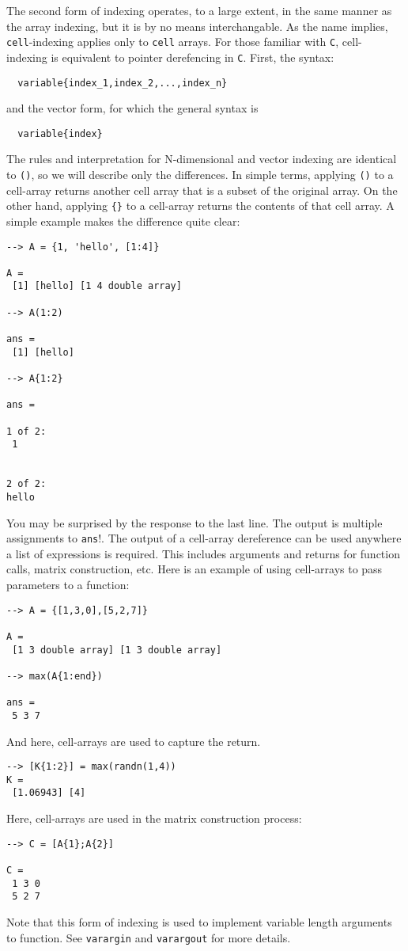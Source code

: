 The second form of indexing operates, to a large extent, in
the same manner as the array indexing, but it is by no means
interchangable.  As the name implies, \verb|cell|-indexing applies
only to \verb|cell| arrays.  For those familiar with \verb|C|, cell-
indexing is equivalent to pointer derefencing in \verb|C|.  First,
the syntax:
\begin{verbatim}
  variable{index_1,index_2,...,index_n}
\end{verbatim}
and the vector form, for which the general syntax is
\begin{verbatim}
  variable{index}
\end{verbatim}
The rules and interpretation for N-dimensional and vector indexing
are identical to \verb|()|, so we will describe only the differences.
In simple terms, applying \verb|()| to a cell-array returns another
cell array that is a subset of the original array.  On the other
hand, applying \verb|{}| to a cell-array returns the contents of that
cell array.  A simple example makes the difference quite clear:
\begin{verbatim}
--> A = {1, 'hello', [1:4]}

A = 
 [1] [hello] [1 4 double array] 

--> A(1:2)

ans = 
 [1] [hello] 

--> A{1:2}

ans = 

1 of 2:
 1 


2 of 2:
hello
\end{verbatim}
You may be surprised by the response to the last line.  The output
is multiple assignments to \verb|ans|!.  The output of a cell-array
dereference can be used anywhere a list of expressions is required.
This includes arguments and returns for function calls, matrix
construction, etc.  Here is an example of using cell-arrays to pass
parameters to a function:
\begin{verbatim}
--> A = {[1,3,0],[5,2,7]}

A = 
 [1 3 double array] [1 3 double array] 

--> max(A{1:end})

ans = 
 5 3 7 
\end{verbatim}
And here, cell-arrays are used to capture the return.
\begin{verbatim}
--> [K{1:2}] = max(randn(1,4))
K = 
 [1.06943] [4] 
\end{verbatim}
Here, cell-arrays are used in the matrix construction process:
\begin{verbatim}
--> C = [A{1};A{2}]

C = 
 1 3 0 
 5 2 7 
\end{verbatim}
Note that this form of indexing is used to implement variable
length arguments to function.  See \verb|varargin| and \verb|varargout|
for more details.
